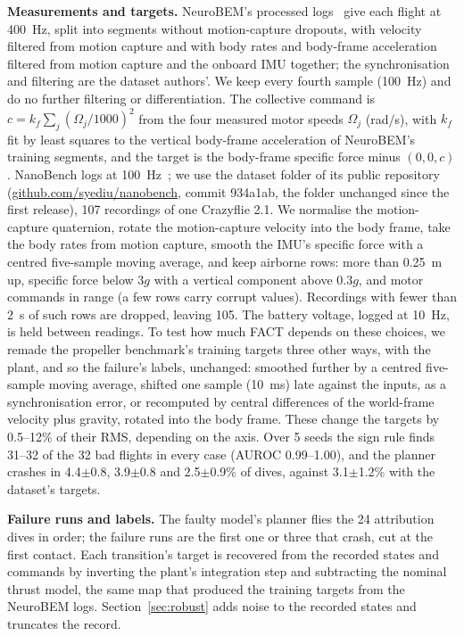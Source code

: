 \documentclass[preprint,12pt]{elsarticle}
\newcommand{\method}{FACT}
\newcommand{\pmse}[2]{#1{\scriptsize$\pm$#2}}
\begin{document}
\textbf{Measurements and targets.} NeuroBEM's processed logs~\citep{bauersfeld2021neurobem} give each flight at 400~Hz, split into segments without motion-capture dropouts, with velocity filtered from motion capture and with body rates and body-frame acceleration filtered from motion capture and the onboard IMU together; the synchronisation and filtering are the dataset authors'. We keep every fourth sample (100~Hz) and do no further filtering or differentiation. The collective command is $c=k_f\sum_j(\Omega_j/1000)^2$ from the four measured motor speeds $\Omega_j$ (rad/s), with $k_f$ fit by least squares to the vertical body-frame acceleration of NeuroBEM's training segments, and the target is the body-frame specific force minus $(0,0,c)$. NanoBench logs at 100~Hz~\citep{ullah2026nanobench}; we use the dataset folder of its public repository (\url{github.com/syediu/nanobench}, commit 934a1ab, the folder unchanged since the first release), 107 recordings of one Crazyflie 2.1. We normalise the motion-capture quaternion, rotate the motion-capture velocity into the body frame, take the body rates from motion capture, smooth the IMU's specific force with a centred five-sample moving average, and keep airborne rows: more than 0.25~m up, specific force below $3g$ with a vertical component above $0.3g$, and motor commands in range (a few rows carry corrupt values). Recordings with fewer than 2~s of such rows are dropped, leaving 105. The battery voltage, logged at 10~Hz, is held between readings. To test how much \method{} depends on these choices, we remade the propeller benchmark's training targets three other ways, with the plant, and so the failure's labels, unchanged: smoothed further by a centred five-sample moving average, shifted one sample (10~ms) late against the inputs, as a synchronisation error, or recomputed by central differences of the world-frame velocity plus gravity, rotated into the body frame. These change the targets by 0.5--12\% of their RMS, depending on the axis. Over 5 seeds the sign rule finds 31--32 of the 32 bad flights in every case (AUROC 0.99--1.00), and the planner crashes in \pmse{4.4}{0.8}, \pmse{3.9}{0.8} and \pmse{2.5}{0.9}\% of dives, against \pmse{3.1}{1.2}\% with the dataset's targets.

\textbf{Failure runs and labels.} The faulty model's planner flies the 24 attribution dives in order; the failure runs are the first one or three that crash, cut at the first contact. Each transition's target is recovered from the recorded states and commands by inverting the plant's integration step and subtracting the nominal thrust model, the same map that produced the training targets from the NeuroBEM logs. Section~\ref{sec:robust} adds noise to the recorded states and truncates the record.
\end{document}
